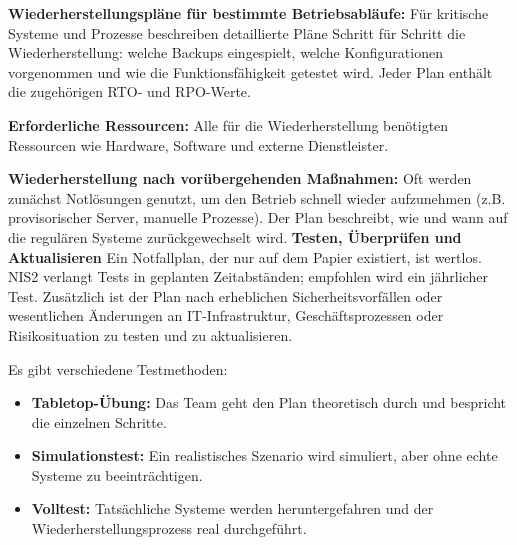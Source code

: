 \textbf{Wiederherstellungspläne für bestimmte Betriebsabläufe:} Für kritische Systeme und Prozesse beschreiben detaillierte Pläne Schritt für Schritt die Wiederherstellung: welche Backups eingespielt, welche Konfigurationen vorgenommen und wie die Funktionsfähigkeit getestet wird. Jeder Plan enthält die zugehörigen RTO- und RPO-Werte.

\textbf{Erforderliche Ressourcen:} Alle für die Wiederherstellung benötigten Ressourcen wie Hardware, Software und externe Dienstleister.

\textbf{Wiederherstellung nach vorübergehenden Maßnahmen:} Oft werden zunächst Notlösungen genutzt, um den Betrieb schnell wieder aufzunehmen (z.B. provisorischer Server, manuelle Prozesse). Der Plan beschreibt, wie und wann auf die regulären Systeme zurückgewechselt wird.
\newpage
\textbf{Testen, Überprüfen und Aktualisieren}
Ein Notfallplan, der nur auf dem Papier existiert, ist wertlos. NIS2 verlangt Tests in geplanten Zeitabständen; empfohlen wird ein jährlicher Test. Zusätzlich ist der Plan nach erheblichen Sicherheitsvorfällen oder wesentlichen Änderungen an IT-Infrastruktur, Geschäftsprozessen oder Risikosituation zu testen und zu aktualisieren.

Es gibt verschiedene Testmethoden:
\begin{itemize}
    \item \textbf{Tabletop-Übung:} Das Team geht den Plan theoretisch durch und bespricht die einzelnen Schritte.
    \item \textbf{Simulationstest:} Ein realistisches Szenario wird simuliert, aber ohne echte Systeme zu beeinträchtigen.
    \item \textbf{Volltest:} Tatsächliche Systeme werden heruntergefahren und der Wiederherstellungsprozess real durchgeführt.
\end{itemize}

